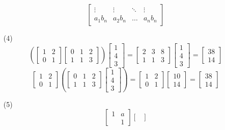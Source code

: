 \documentclass[12pt]{article}
\begin{document}
\begin{itemize}
$$\begin{bmatrix}
\vdots & \vdots & \ddots & \vdots \\
a_1b_n & a_2b_n & \hdots & a_nb_n
\end{bmatrix}$$
\item[(4)]
$$\left( \begin{bmatrix}
1 & 2 \\
0 & 1
\end{bmatrix}\begin{bmatrix}
0 & 1 & 2 \\
1 & 1 & 3
\end{bmatrix} \right)\begin{bmatrix}
1 \\
4 \\
3
\end{bmatrix} = \begin{bmatrix}
2 & 3 & 8 \\
1 & 1 & 3
\end{bmatrix}\begin{bmatrix}
1 \\
4 \\
3
\end{bmatrix} = \begin{bmatrix}
38 \\
14
\end{bmatrix}$$
$$\begin{bmatrix}
1 & 2 \\
0 & 1
\end{bmatrix} \left(\begin{bmatrix}
0 & 1 & 2 \\
1 & 1 & 3
\end{bmatrix}\begin{bmatrix}
1 \\
4 \\
3
\end{bmatrix} \right) = \begin{bmatrix}
1 & 2 \\
0 & 1
\end{bmatrix}\begin{bmatrix}
10 \\
14
\end{bmatrix} = \begin{bmatrix}
38 \\
14
\end{bmatrix}$$
\item[(5)]
$$\begin{bmatrix}
1 & a \\
& 1
\end{bmatrix}\begin{bmatrix}

\end{bmatrix}$$
\end{itemize}
\end{document}

